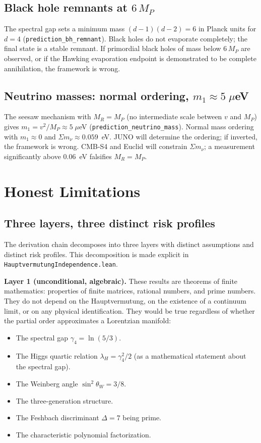 \documentclass[11pt,letterpaper]{article}
\theoremstyle{remark}
\newcommand{\lean}[1]{\texttt{\small #1}}
\begin{document}
\subsection{Black hole remnants at $6\,M_P$}

The spectral gap sets a minimum mass $(d{-}1)(d{-}2) = 6$ in Planck
units for $d = 4$ (\lean{prediction\_bh\_remnant}). Black holes do
not evaporate completely; the final state is a stable remnant. If
primordial black holes of mass below $6\,M_P$ are observed, or if
the Hawking evaporation endpoint is demonstrated to be complete
annihilation, the framework is wrong.

\subsection{Neutrino masses: normal ordering, $m_1 \approx 5\;\mu$eV}

The seesaw mechanism with $M_R = M_P$ (no intermediate scale between
$v$ and $M_P$) gives $m_1 = v^2/M_P \approx 5\;\mu$eV
(\lean{prediction\_neutrino\_mass}).  Normal mass ordering with
$m_1 \approx 0$ and $\Sigma m_\nu \approx 0.059$~eV. JUNO will
determine the ordering; if inverted, the framework is wrong. CMB-S4
and Euclid will constrain $\Sigma m_\nu$; a measurement significantly
above $0.06$~eV falsifies $M_R = M_P$.

\section{Honest Limitations}
\label{sec:gaps}

\subsection{Three layers, three distinct risk profiles}

The derivation chain decomposes into three layers with distinct
assumptions and distinct risk profiles. This decomposition is made
explicit in \lean{HauptvermutungIndependence.lean}.

\textbf{Layer 1 (unconditional, algebraic).} These results are
theorems of finite mathematics: properties of finite matrices,
rational numbers, and prime numbers. They do not depend on the
Hauptvermutung, on the existence of a continuum limit, or on any
physical identification. They would be true regardless of whether
the partial order approximates a Lorentzian manifold:
\begin{itemize}[nosep]
  \item The spectral gap $\gamma_4 = \ln(5/3)$.
  \item The Higgs quartic relation $\lambda_H = \gamma_4^2/2$
    (as a mathematical statement about the spectral gap).
  \item The Weinberg angle $\sin^2\theta_W = 3/8$.
  \item The three-generation structure.
  \item The Feshbach discriminant $\Delta = 7$ being prime.
  \item The characteristic polynomial factorization.
\end{itemize}
\end{document}

